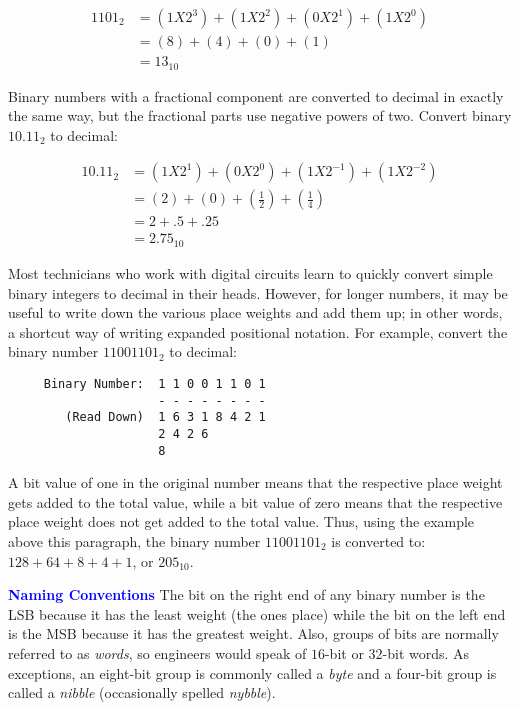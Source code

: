 \begin{align}
  1101_2 &= (1X2^3)+(1X2^2)+(0X2^1)+(1X2^0) \\
  \nonumber
  &= (8)+(4)+(0)+(1) \\
  \nonumber
  &= 13_{10}
\end{align}

Binary numbers with a fractional component are converted to decimal in exactly the same way, but the fractional parts use negative powers of two. Convert binary $ 10.11_2 $ to decimal: 

\begin{align}
  10.11_2 &= (1X2^1)+(0X2^0)+(1X2^{-1})+(1X2^{-2}) \\
  \nonumber
  &= (2)+(0)+(\frac{1}{2})+(\frac{1}{4}) \\
  \nonumber
  &= 2+.5+.25 \\
  \nonumber
  &= 2.75_{10}
\end{align}

Most technicians who work with digital circuits learn to quickly convert simple binary integers to decimal in their heads. However, for longer numbers, it may be useful to write down the various place weights and add them up; in other words, a shortcut way of writing expanded positional notation. For example, convert the binary number $ 11001101_2 $ to decimal: 

\begin{verbatim}
     Binary Number:  1 1 0 0 1 1 0 1
                     - - - - - - - - 
        (Read Down)  1 6 3 1 8 4 2 1 
                     2 4 2 6     
                     8 
\end{verbatim}

A bit value of one in the original number means that the respective place weight gets added to the total value, while a bit value of zero means that the respective place weight does not get added to the total value. Thus, using the example above this paragraph, the binary number $ 11001101_2 $ is converted to: $ 128+64+8+4+1 $, or $ 205_{10} $.

\bigskip

\begin{tcolorbox}[colback=blue!5!white,colframe=blue!75!black]
  \textcolor{blue}{\textbf{Naming Conventions}}
  \tcblower
  The bit on the right end of any binary number is the \ac{LSB} because it has the least weight (the ones place) while the bit on the left end is the \ac{MSB} because it has the greatest weight. Also, groups of bits are normally referred to as \emph{words}, so engineers would speak of $ 16 $-bit or $ 32 $-bit words. As exceptions, an eight-bit group is commonly called a \emph{byte} and a four-bit group is called a \emph{nibble} (occasionally spelled \emph{nybble}).
\end{tcolorbox}

